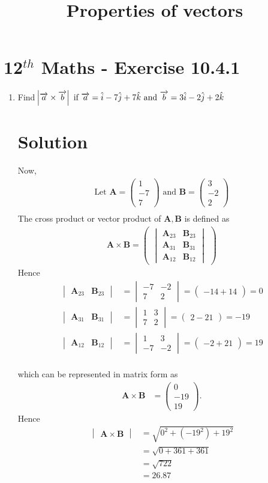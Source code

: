 \documentclass[12pt]{article}
\newcommand{\mydet}[1]{\ensuremath{\begin{vmatrix}#1\end{vmatrix}}}
\newcommand{\myvec}[1]{\ensuremath{\begin{pmatrix}#1\end{pmatrix}}}
\let\vec\mathbf
\begin{document}
\begin{center}
\title{\textbf{Properties of vectors}}
\date{\vspace{-5ex}} %
\maketitle
\end{center}
\setcounter{page}{1}
\section{12$^{th}$ Maths - Exercise 10.4.1}

\begin{enumerate}
\item Find $\abs{\overrightarrow{a}\times\overrightarrow{b}}\text{ if }\overrightarrow{a}=\hat{i}-7\hat{j}+7\hat{k}\text{ and }\overrightarrow{b}=3\hat{i}-2\hat{j}+2\hat{k}$
\section{Solution}
Now,
\begin{align}
\text{Let } \vec{A} = \myvec{1\\-7\\7} \text{ and } \vec{B} = \myvec{3\\ -2 \\ 2}\\
\end{align}
The cross product or vector product of $\vec{A},\vec{B}$ is defined as
\begin{align}
	\vec{A} \times \vec{B} = \myvec{\mydet{\vec{A}_{23}&\vec{B}_{23}\\\vec{A}_{31}&\vec{B}_{31}\\\vec{A}_{12}&\vec{B}_{12}}}
\end{align}
Hence
\begin{align}
	\mydet{\vec{A}_{23}&\vec{B}_{23}}&=\mydet{-7&-2\\7&2}=\myvec{-14+14}=0\\
	\mydet{\vec{A}_{31}&\vec{B}_{31}}&=\mydet{1&3\\7&2}=\myvec{2-21}=-19\\
	\mydet{\vec{A}_{12}&\vec{B}_{12}}&=\mydet{1&3\\-7&-2}=\myvec{-2+21}=19\\
\end{align}

which can be represented in matrix form as
\begin{align}
	\vec{A} \times \vec{B}&=\myvec{0\\-19\\19}.
\end{align}
Hence
\begin{align}
\mydet{\vec{A} \times \vec{B}}&=\sqrt{0^2+(-19^2)+19^2}\\
&=\sqrt{0+361+361}\\
 &= \sqrt{722}\\
 &=26.87
\end{align}

\end{enumerate}
\end{document}
